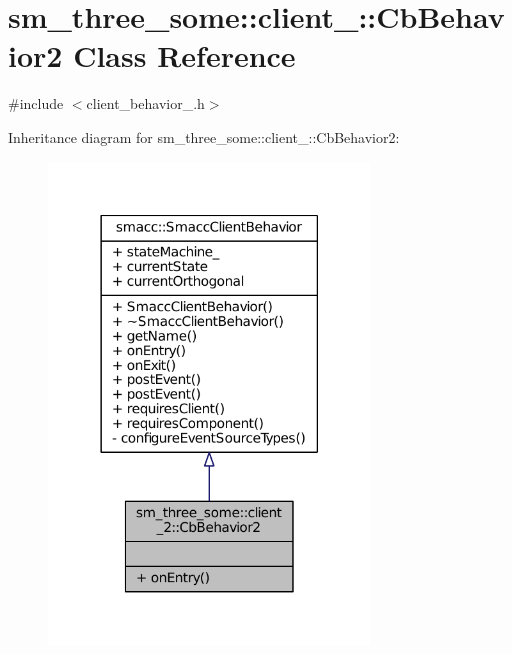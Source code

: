 \hypertarget{classsm__three__some_1_1client__2_1_1CbBehavior2}{}\section{sm\+\_\+three\+\_\+some\+:\+:client\+\_\+:\+:Cb\+Behavior2 Class Reference}
\label{classsm__three__some_1_1client__2_1_1CbBehavior2}


{\ttfamily \#include $<$client\+\_\+behavior\+\_.\+h$>$}



Inheritance diagram for sm\+\_\+three\+\_\+some\+:\+:client\+\_\+:\+:Cb\+Behavior2\+:
\nopagebreak
\begin{figure}[H]
\begin{center}
\leavevmode
\includegraphics[width=242pt]{classsm__three__some_1_1client__2_1_1CbBehavior2__inherit__graph}
\end{center}
\end{figure}


